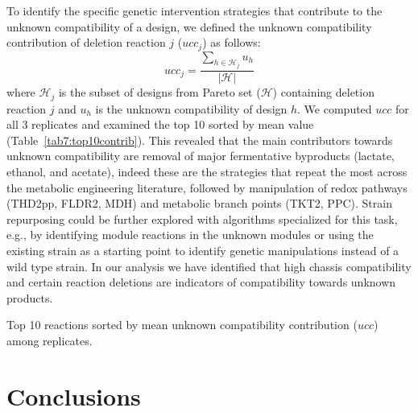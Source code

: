 {To identify the specific genetic intervention strategies that contribute to
the unknown compatibility of a design,  we defined the unknown compatibility contribution of deletion reaction $j$ ($ucc_j$) as follows:
\begin{equation}
    ucc_j=\frac{\sum\limits_{h\in\mathcal{H}_j} u_h}{|\mathcal{H}|}
\end{equation}
where $\mathcal{H}_j$ is the subset of designs from Pareto set ($\mathcal{H}$) containing deletion reaction $j$ and $u_h$ is the unknown compatibility of design $h$. %
We computed $ucc$ for all 3 replicates and examined the top 10 sorted by mean value (Table~\ref{tab7:top10contrib}).
This revealed that the main contributors towards unknown compatibility are removal of major fermentative byproducts (lactate, ethanol, and acetate), indeed these are the strategies that repeat the most across the metabolic engineering literature,\citep{winkler2015} followed by manipulation of redox pathways (THD2pp, FLDR2, MDH) and metabolic branch points (TKT2, PPC).
Strain repurposing could be further explored with algorithms specialized for this task, e.g., by identifying module reactions in the unknown modules or using the existing strain as a starting point to identify genetic manipulations instead of a wild type strain.
In our analysis we have identified that high chassis compatibility and certain reaction deletions are indicators of compatibility towards unknown products.


\begin{table}[h]
    \caption[Top 10 reactions with highest unknown compatibility contribution]{Top 10 reactions sorted by mean unknown compatibility contribution ($ucc$) among replicates. }
    \centering
    
    \label{tab7:top10contrib}
\end{table}

\section{Conclusions}
%
%

}
